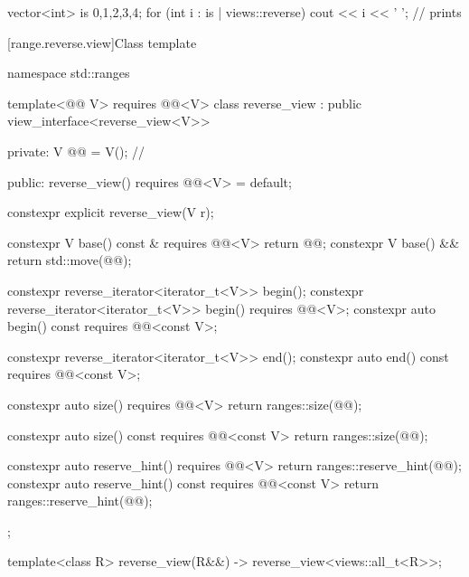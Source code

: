 \pnum
\begin{example}
\begin{codeblock}
vector<int> is {0,1,2,3,4};
for (int i : is | views::reverse)
  cout << i << ' '; // prints 
\end{codeblock}
\end{example}

[range.reverse.view]{Class template }

%
%
%
\begin{codeblock}
namespace std::ranges {
  template<@@ V>
    requires @@<V>
  class reverse_view : public view_interface<reverse_view<V>> {
  private:
    V @@ = V();  // \expos

  public:
    reverse_view() requires @@<V> = default;

    constexpr explicit reverse_view(V r);

    constexpr V base() const & requires @@<V> { return @@; }
    constexpr V base() && { return std::move(@@); }

    constexpr reverse_iterator<iterator_t<V>> begin();
    constexpr reverse_iterator<iterator_t<V>> begin() requires @@<V>;
    constexpr auto begin() const requires @@<const V>;

    constexpr reverse_iterator<iterator_t<V>> end();
    constexpr auto end() const requires @@<const V>;

    constexpr auto size() requires @@<V> {
      return ranges::size(@@);
    }

    constexpr auto size() const requires @@<const V> {
      return ranges::size(@@);
    }

    constexpr auto reserve_hint() requires @@<V> {
      return ranges::reserve_hint(@@);
    }
    constexpr auto reserve_hint() const requires @@<const V> {
      return ranges::reserve_hint(@@);
    }
  };

  template<class R>
    reverse_view(R&&) -> reverse_view<views::all_t<R>>;
}
\end{codeblock}

